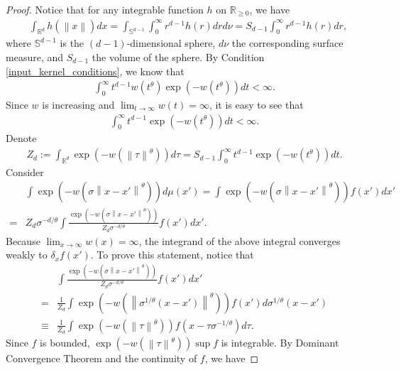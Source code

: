 \documentclass[10pt]{article}
\newcommand{\norm}[1]{\left\lVert#1\right\rVert}
\newenvironment{Proof of lemma}{\noindent{\bf Proof of Lemma}}{\hfill$\Box$\newline}
\newenvironment{Proof of claim}{\noindent{\bf Proof of claim}}{\hfill$\Box$\newline}
\newenvironment{Proof of theorem}{\noindent{\bf Proof of Theorem}}{\hfill\scriptsize{$\Box$}\newline}
\newenvironment{Proof of theorems}{\noindent{\bf Proof of Theorems}}{\hfill$\Box$\newline}
\newenvironment{Proof of proposition}{\noindent{\bf Proof of Proposition}}{\hfill$\Box$\newline}
\newenvironment{Proof of propositions}{\noindent{\bf Proof of Propositions}}{\hfill$\Box$\newline}
\newenvironment{Proof of exercise}{\noindent{\it Proof of Exercise:}}{\hfill$\Box$}
\numberwithin{equation}{section}
\begin{document}
\begin{proof}
    Notice that for any integrable function $h$ on $\mathbb{R}_{\geq 0}$, we have
    \begin{align}
         & \int_{\mathbb{R}^d} h(\norm{x}) dx = \int_{\mathbb{S}^{d-1}} \int_0^{\infty} r^{d-1}h(r) dr d\nu=S_{d-1} \int_0^{\infty} r^{d-1}h(r) dr,
    \end{align}
    where $\mathbb{S}^{d-1}$ is the $(d-1)$-dimensional sphere, $d\nu$ the corresponding surface measure, and $S_{d-1}$ the volume of the sphere. By Condition \ref{input_kernel_conditions}, we know that
    \begin{align}
        \int_0^{\infty} t^{d-1} w(t^{\theta}) \exp(-w(t^{\theta}))dt < \infty.
    \end{align}
    Since $w$ is increasing and $\lim_{t \to \infty} w(t) = \infty$, it is easy to see that
    \begin{align}
        \int_0^{\infty} t^{d-1} \exp(-w(t^{\theta}))dt < \infty.
    \end{align}
    Denote
    \begin{align}
        Z_d :=\int_{\mathbb{R}^d}\exp(-w(\norm{\tau}^{\theta})) d \tau = S_{d-1} \int_0^{\infty} t^{d-1}\exp(-w(t^{\theta})) dt.
    \end{align}
    Consider
    \begin{align}
          & \int \exp(-w(\sigma\norm{x-x'}^{\theta}))d\mu(x') = \int \exp(-w(\sigma\norm{x-x'}^{\theta})) f(x')dx' \nonumber \\
        = & Z_d \sigma^{-d/\theta}\int \frac{\exp(-w(\sigma\norm{x-x'}^{\theta}))}{Z_d \sigma^{-d/\theta}} f(x')dx'.
    \end{align}
    Because $\lim_{x \to \infty} w(x) = \infty$, the integrand of the above integral converges weakly to $\delta_x f(x')$. To prove this statement, notice that
    \begin{align}
               & \int \frac{\exp(-w(\sigma\norm{x-x'}^{\theta}))}{Z_d \sigma^{-d/\theta}} f(x')dx' \nonumber                                          \\
        =      & \frac{1}{Z_d} \int \exp\left(-w \left(\norm{\sigma^{1/\theta}(x-x')}^{\theta}\right)\right) f(x') d\sigma^{1/\theta}(x-x') \nonumber \\
        \equiv & \frac{1}{Z_d} \int \exp(-w(\norm{\tau}^{\theta})) f(x-\tau \sigma^{-1/\theta}) d\tau.
    \end{align}
    Since $f$ is bounded, $\exp(-w(\norm{\tau}^{\theta})) \sup f$ is integrable. By Dominant Convergence Theorem and the continuity of $f$, we have

\end{proof}
\end{document}

